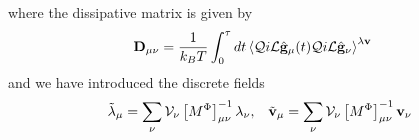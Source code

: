\documentclass[b5paper,openright,10pt]{book}
\newcommand{\llangle}{\left\langle}
\newcommand{\rrangle}{\right\rangle}
\begin{document}
where the dissipative matrix is given by
\begin{align}
{\bf D}_{\mu\nu}&=  \frac{1}{k_BT}
\int_0^\tau dt \llangle {\cal Q}i{\cal L}\hat{\bf g}_\mu(t){\cal Q}i{\cal L}\hat{\bf g}_\nu\rrangle^{\lambda{\bf v}} 
\label{Dmunu}
\end{align}
and we have introduced the discrete fields
\begin{align}
    \tilde{\lambda}_\mu=\sum_\nu{\cal V}_{\nu}\left[M^\Phi\right]^{-1}_{\mu\nu}\lambda_{\nu}, &&
\tilde{\bf v}_\mu=\sum_\nu{\cal V}_{\nu}\left[M^\Phi\right]^{-1}_{\mu\nu}{\bf v}_{\nu}
\label{overlined}
\end{align}
\end{document}

